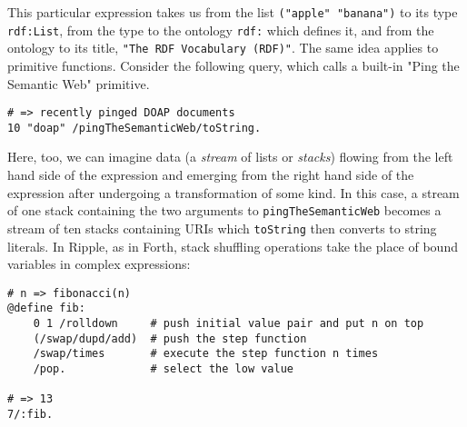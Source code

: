 \documentclass[runningheads]{llncs}
\begin{document}
This particular expression takes us from the list \texttt{("apple" "banana")} to its type \texttt{rdf:List}, from the type to the ontology \texttt{rdf:} which defines it, and from the ontology to its title, \texttt{"The RDF Vocabulary (RDF)"}.  The same idea applies to primitive functions.  Consider the following query, which calls a built-in "Ping the Semantic Web" primitive.
\begin{verbatim}
# => recently pinged DOAP documents
10 "doap" /pingTheSemanticWeb/toString.
\end{verbatim}
Here, too, we can imagine data (a \textit{stream} of lists or \textit{stacks}) flowing from the left hand side of the expression and emerging from the right hand side of the expression after undergoing a transformation of some kind.  In this case, a stream of one stack containing the two arguments to \texttt{pingTheSemanticWeb} becomes a stream of ten stacks containing URIs which \texttt{toString} then converts to string literals.
In Ripple, as in Forth, stack shuffling operations take the place of bound variables in complex expressions:
\begin{verbatim}
# n => fibonacci(n)
@define fib:
    0 1 /rolldown     # push initial value pair and put n on top
    (/swap/dupd/add)  # push the step function
    /swap/times       # execute the step function n times
    /pop.             # select the low value

# => 13
7/:fib.
\end{verbatim}
\end{document}
